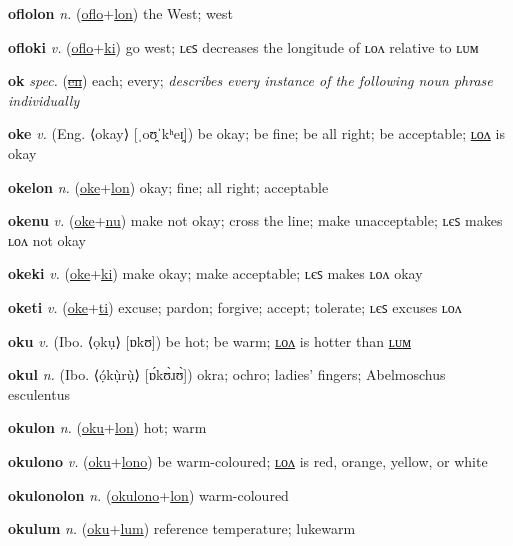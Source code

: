\textbf{\hypertarget{oflolon}{oflolon}} \textit{n.} (\hyperlink{oflo}{oflo}+\allowbreak \hyperlink{lon}{lon})
the West; west

\textbf{\hypertarget{ofloki}{ofloki}} \textit{v.} (\hyperlink{oflo}{oflo}+\allowbreak \hyperlink{ki}{ki})
go west; ʟєꜱ decreases the longitude of ʟᴏᴧ relative to ʟᴜᴍ

\textbf{\hypertarget{ok}{ok}} \textit{spec.} (\hyperlink{en}{\sout{en}})
each; every; \textit{describes every instance of the following noun phrase individually}

\textbf{\hypertarget{oke}{oke}} \textit{v.} (Eng. ⟨okay⟩ [ˌoʊ̯ˈkʰeɪ̯])
be okay; be fine; be all right; be acceptable; \hyperlink{okelon}{ʟᴏᴧ} is okay

\textbf{\hypertarget{okelon}{okelon}} \textit{n.} (\hyperlink{oke}{oke}+\allowbreak \hyperlink{lon}{lon})
okay; fine; all right; acceptable

\textbf{\hypertarget{okenu}{okenu}} \textit{v.} (\hyperlink{oke}{oke}+\allowbreak \hyperlink{nu}{nu})
make not okay; cross the line; make unacceptable; ʟєꜱ makes ʟᴏᴧ not okay

\textbf{\hypertarget{okeki}{okeki}} \textit{v.} (\hyperlink{oke}{oke}+\allowbreak \hyperlink{ki}{ki})
make okay; make acceptable; ʟєꜱ makes ʟᴏᴧ okay

\textbf{\hypertarget{oketi}{oketi}} \textit{v.} (\hyperlink{oke}{oke}+\allowbreak \hyperlink{ti}{ti})
excuse; pardon; forgive; accept; tolerate; ʟєꜱ excuses ʟᴏᴧ

\textbf{\hypertarget{oku}{oku}} \textit{v.} (Ibo. ⟨ọkụ⟩ [ɒkʊ])
be hot; be warm; \hyperlink{okulon}{ʟᴏᴧ} is hotter than \hyperlink{okulum}{ʟᴜᴍ}

\textbf{\hypertarget{okul}{okul}} \textit{n.} (Ibo. ⟨ọ́kụ̀rụ̀⟩ [ɒ́kʊ̀ɹʊ̀])
okra; ochro; ladies’ fingers; Abelmoschus esculentus

\textbf{\hypertarget{okulon}{okulon}} \textit{n.} (\hyperlink{oku}{oku}+\allowbreak \hyperlink{lon}{lon})
hot; warm

\textbf{\hypertarget{okulono}{okulono}} \textit{v.} (\hyperlink{oku}{oku}+\allowbreak \hyperlink{lono}{lono})
be warm-coloured; \hyperlink{okulonolon}{ʟᴏᴧ} is red, orange, yellow, or white

\textbf{\hypertarget{okulonolon}{okulonolon}} \textit{n.} (\hyperlink{okulono}{okulono}+\allowbreak \hyperlink{lon}{lon})
warm-coloured

\textbf{\hypertarget{okulum}{okulum}} \textit{n.} (\hyperlink{oku}{oku}+\allowbreak \hyperlink{lum}{lum})
reference temperature; lukewarm

